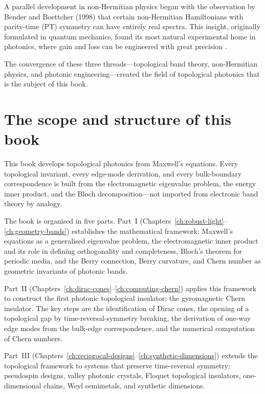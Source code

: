 A parallel development in non-Hermitian physics began with the
observation by Bender and Boettcher (1998) that certain non-Hermitian
Hamiltonians with parity-time (PT) symmetry can have entirely real
spectra.  This insight, originally formulated in quantum mechanics,
found its most natural experimental home in photonics, where gain and
loss can be engineered with great precision
\cite{bender1998real,guo2009observation}.

The convergence of these three threads---topological band theory,
non-Hermitian physics, and photonic engineering---created the field of
topological photonics that is the subject of this book.

\section{The scope and structure of this book}
\label{sec:ch1-scope-structure}

This book develops topological photonics from Maxwell's equations.
Every topological invariant, every edge-mode derivation, and every
bulk-boundary correspondence is built from the electromagnetic
eigenvalue problem, the energy inner product, and the Bloch
decomposition---not imported from electronic band theory by analogy.

The book is organised in five parts.  Part~I
(Chapters~\ref{ch:robust-light}--\ref{ch:geometry-bands}) establishes
the mathematical framework: Maxwell's equations as a generalised
eigenvalue problem, the electromagnetic inner product and its role in
defining orthogonality and completeness, Bloch's theorem for periodic
media, and the Berry connection, Berry curvature, and Chern number as
geometric invariants of photonic bands.

Part~II (Chapters~\ref{ch:dirac-cones}--\ref{ch:computing-chern})
applies this framework to construct the first photonic topological
insulator: the gyromagnetic Chern insulator.  The key steps are the
identification of Dirac cones, the opening of a topological gap by
time-reversal-symmetry breaking, the derivation of one-way edge modes
from the bulk-edge correspondence, and the numerical computation of
Chern numbers.

Part~III (Chapters~\ref{ch:reciprocal-designs}--\ref{ch:synthetic-dimensions})
extends the topological framework to systems that preserve time-reversal
symmetry: pseudospin designs, valley photonic crystals, Floquet
topological insulators, one-dimensional chains, Weyl semimetals,
and synthetic dimensions.

